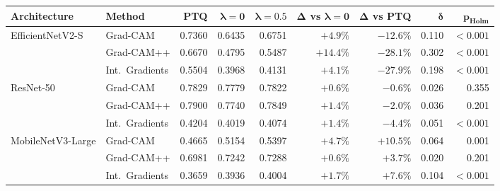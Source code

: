 \begin{tabular}{llrrrrrrr}
\toprule
\textbf{Architecture} & \textbf{Method} & \textbf{PTQ} & $\boldsymbol{\lambda=0}$ & $\boldsymbol{\lambda=0.5}$ & $\boldsymbol{\Delta}$ \textbf{vs} $\boldsymbol{\lambda=0}$ & $\boldsymbol{\Delta}$ \textbf{vs PTQ} & $\boldsymbol{\delta}$ & $\boldsymbol{p_{\text{Holm}}}$ \\
\midrule
\multirow{3}{*}{EfficientNetV2-S} & Grad-CAM & 0.7360 & 0.6435 & 0.6751 & $+4.9\%$ & $-12.6\%$ & 0.110 & $<0.001$ \\
 & Grad-CAM++ & 0.6670 & 0.4795 & 0.5487 & $+14.4\%$ & $-28.1\%$ & 0.302 & $<0.001$ \\
 & Int.\ Gradients & 0.5504 & 0.3968 & 0.4131 & $+4.1\%$ & $-27.9\%$ & 0.198 & $<0.001$ \\
\midrule
\multirow{3}{*}{ResNet-50} & Grad-CAM & 0.7829 & 0.7779 & 0.7822 & $+0.6\%$ & $-0.6\%$ & 0.026 & 0.355 \\
 & Grad-CAM++ & 0.7900 & 0.7740 & 0.7849 & $+1.4\%$ & $-2.0\%$ & 0.036 & 0.201 \\
 & Int.\ Gradients & 0.4204 & 0.4019 & 0.4074 & $+1.4\%$ & $-4.4\%$ & 0.051 & $<0.001$ \\
\midrule
\multirow{3}{*}{MobileNetV3-Large} & Grad-CAM & 0.4665 & 0.5154 & 0.5397 & $+4.7\%$ & $+10.5\%$ & 0.064 & 0.001 \\
 & Grad-CAM++ & 0.6981 & 0.7242 & 0.7288 & $+0.6\%$ & $+3.7\%$ & 0.020 & 0.201 \\
 & Int.\ Gradients & 0.3659 & 0.3936 & 0.4004 & $+1.7\%$ & $+7.6\%$ & 0.104 & $<0.001$ \\
\bottomrule
\end{tabular}
